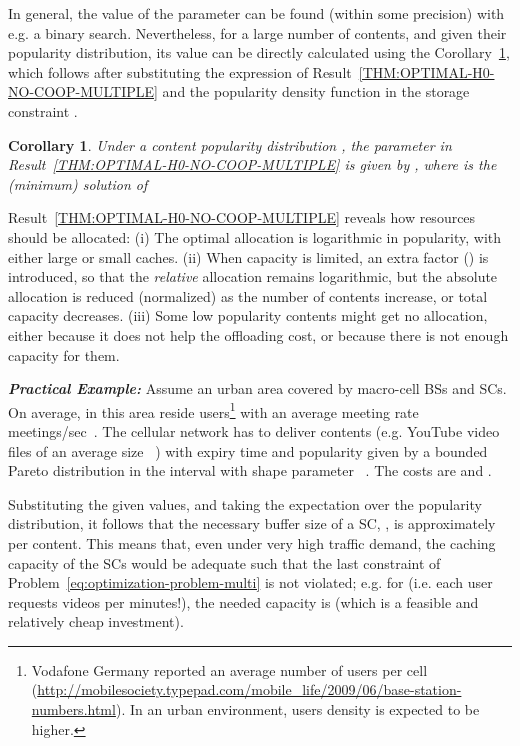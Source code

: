 \documentclass[10pt,conference,letterpaper]{IEEEtran}
\newtheorem{corollary}{Corollary}
\begin{document}
In general, the value of the parameter  can be found (within some precision) with e.g. a binary search. Nevertheless, for a large number of contents, and given their popularity distribution, its value can be directly calculated using the Corollary~\ref{thm:corollary}, which follows after substituting the expression of Result~\ref{THM:OPTIMAL-H0-NO-COOP-MULTIPLE} and the popularity density function in the storage constraint .
\begin{corollary}\label{thm:corollary}
Under a content popularity distribution , the parameter  in Result~\ref{THM:OPTIMAL-H0-NO-COOP-MULTIPLE} is given by , where  is the (minimum) solution of

\end{corollary}

Result~\ref{THM:OPTIMAL-H0-NO-COOP-MULTIPLE} reveals how resources should be allocated:
(i) The optimal allocation is logarithmic in popularity, with either large or small caches. (ii) When capacity is limited, an extra factor () is introduced, so that the \emph{relative} allocation remains logarithmic, but the absolute allocation is reduced (normalized) as the number of contents increase, or total capacity decreases. (iii) Some low popularity contents might get no allocation, either because it does not help the offloading cost, or because there is not enough capacity for them.



\textbf{\textit{Practical Example:}} Assume an urban area covered by  macro-cell BSs and  SCs. On average, in this area reside  users\footnote{Vodafone Germany reported an average number of  users per cell (\url{http://mobilesociety.typepad.com/mobile_life/2009/06/base-station-numbers.html}). In an urban environment, users density is expected to be higher.} with an average meeting rate  meetings/sec~\cite{infocom-trace}. The cellular network has to deliver  contents (e.g. YouTube video files of an average size ~\cite{youtube-traffic-from-edge}) with expiry time  and popularity given by a bounded Pareto distribution in the interval  with shape parameter ~\cite{youtube-traffic-from-edge}. The costs are  and .

Substituting the given values, and taking the expectation over the popularity distribution, it follows that the necessary buffer size of a SC, , is approximately  per content. This means that, even under very high traffic demand, the caching capacity of the SCs would be adequate such that the last constraint of Problem~\ref{eq:optimization-problem-multi} is not violated; e.g. for  (i.e. each user requests  videos per  minutes!), the needed capacity is  (which is a feasible and relatively cheap investment). 
\end{document}
